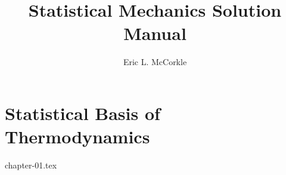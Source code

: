 \documentclass{report}
\title{Statistical Mechanics Solution Manual}
\author{Eric L. McCorkle}
\begin{document}
\maketitle
\tableofcontents

\chapter{Statistical Basis of Thermodynamics}
{chapter-01.tex}
\end{document}
